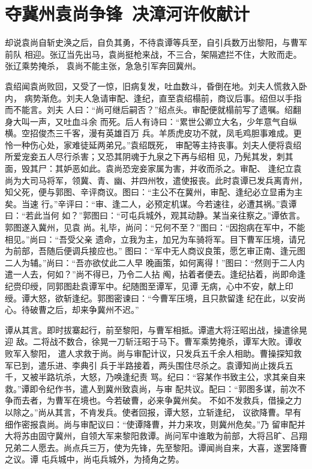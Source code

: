\chapter{夺冀州袁尚争锋~决漳河许攸献计}

却说袁尚自斩史涣之后，自负其勇，不待袁谭等兵至，自引兵数万出黎阳，与曹军前队
相迎。张辽当先出马，袁尚挺枪来战，不三合，架隔遮拦不住，大败而走。张辽乘势掩杀，
袁尚不能主张，急急引军奔回冀州。

袁绍闻袁尚败回，又受了一惊，旧病复发，吐血数斗，昏倒在地。刘夫人慌救入卧内，
病势渐危。刘夫人急请审配、逢纪，直至袁绍榻前，商议后事。绍但以手指而不能言。刘夫
人曰：“尚可继后嗣否？”绍点头。审配便就榻前写了遗嘱。绍翻身大叫一声，又吐血斗余
而死。后人有诗曰：“累世公卿立大名，少年意气自纵横。空招俊杰三千客，漫有英雄百万
兵。羊质虎皮功不就，凤毛鸡胆事难成。更怜一种伤心处，家难徒延两弟兄。”袁绍既死，
审配等主持丧事。刘夫人便将袁绍所爱宠妾五人尽行杀害；又恐其阴魂于九泉之下再与绍相
见，乃髡其发，刺其面，毁其尸：其妒恶如此。袁尚恐宠妾家属为害，并收而杀之。审配、
逢纪立袁尚为大司马将军，领冀、青、幽、并四州牧，遣使报丧。此时袁谭已发兵离青州，
知父死，便与郭图、辛评商议。图曰：“主公不在冀州，审配、逢纪必立显甫为主矣。当速
行。”辛评曰：“审、逢二人，必预定机谋。今若速往，必遭其祸。”袁谭曰：“若此当何
如？”郭图曰：“可屯兵城外，观其动静。某当亲往察之。”谭依言。郭图遂入冀州，见袁
尚。礼毕，尚问：“兄何不至？”图曰：“因抱病在军中，不能相见。”尚曰：“吾受父亲
遗命，立我为主，加兄为车骑将军。目下曹军压境，请兄为前部，吾随后便调兵接应也。”
图曰：“军中无人商议良策，愿乞审正南、逢元图二人为辅。”尚曰：“吾亦欲仗此二人早
晚画策，如何离得！”图曰：“然则于二人内遣一人去，何如？”尚不得已，乃令二人拈
阄，拈着者便去。逢纪拈着，尚即命逢纪赍印绶，同郭图赴袁谭军中。纪随图至谭军，见谭
无病，心中不安，献上印绶。谭大怒，欲斩逢纪。郭图密谏曰：“今曹军压境，且只款留逢
纪在此，以安尚心。待破曹之后，却来争冀州不迟。”

谭从其言。即时拔寨起行，前至黎阳，与曹军相抵。谭遣大将汪昭出战，操遣徐晃迎
敌。二将战不数合，徐晃一刀斩汪昭于马下。曹军乘势掩杀，谭军大败。谭收败军入黎阳，
遣人求救于尚。尚与审配计议，只发兵五千余人相助。曹操探知救军已到，遣乐进、李典引
兵于半路接着，两头围住尽杀之。袁谭知尚止拨兵五千，又被半路坑杀，大怒，乃唤逢纪责
骂。纪曰：“容某作书致主公，求其亲自来救。”谭即令纪作书，遣人到冀州致袁尚，与审
配共议。配曰：“郭图多谋，前次不争而去者，为曹军在境也。今若破曹，必来争冀州矣。
不如不发救兵，借操之力以除之。”尚从其言，不肯发兵。使者回报，谭大怒，立斩逢纪，
议欲降曹。早有细作密报袁尚。尚与审配议曰：“使谭降曹，并力来攻，则冀州危矣。”乃
留审配并大将苏由固守冀州，自领大军来黎阳救谭。尚问军中谁敢为前部，大将吕旷、吕翔
兄弟二人愿去。尚点兵三万，使为先锋，先至黎阳。谭闻尚自来，大喜，遂罢降曹之议。谭
屯兵城中，尚屯兵城外，为掎角之势。

